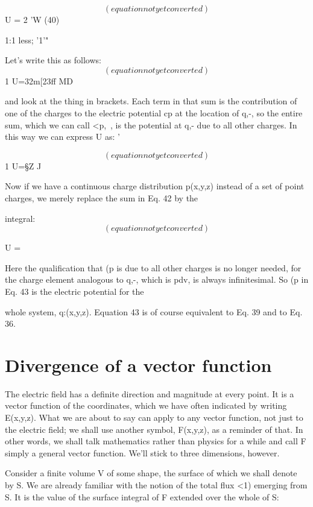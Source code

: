 \begin{equation}
(equation not yet converted)
\end{equation}
U =  2 'W (40)

1:1 less; '1'"

Let's write this as follows:
\begin{equation}
(equation not yet converted)
\end{equation}
1
U=32m[23ff MD

and look at the thing in brackets. Each term in that sum is the contribution
of one of the charges to the electric potential cp at the location
of q,-, so the entire sum, which we can call <p,~, is the potential at
q,- due to all other charges. In this way we can express U as: '

\begin{equation}
(equation not yet converted)
\end{equation}
1
U=§Z%
J

Now if we have a continuous charge distribution p(x,y,z) instead of
a set of point charges, we merely replace the sum in Eq. 42 by the

integral:
\begin{equation}
(equation not yet converted)
\end{equation}

U = %

Here the qualification that (p is due to all other charges is no longer
needed, for the charge element analogous to q,-, which is pdv, is
always infinitesimal. So (p in Eq. 43 is the electric potential for the

whole system, q:(x,y,z). Equation 43 is of course equivalent to
Eq. 39 and to Eq. 36.

\section{Divergence of a vector function}

The electric field has a definite direction and magnitude at every
point. It is a vector function of the coordinates, which we have often
indicated by writing E(x,y,z). What we are about to say can apply
to any vector function, not just to the electric field; we shall use
another symbol, F(x,y,z), as a reminder of that. In other words, we
shall talk mathematics rather than physics for a while and call F
simply a general vector function. We'll stick to three dimensions,
however.

Consider a finite volume V of some shape, the surface of which we
shall denote by S. We are already familiar with the notion of the total
flux <1) emerging from S. It is the value of the surface integral of F
extended over the whole of S:


